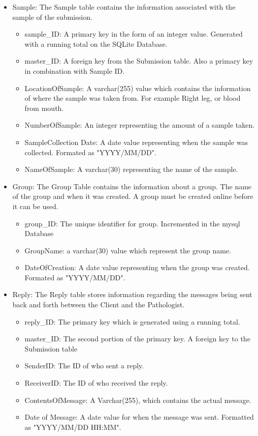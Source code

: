 \documentclass[onecolumn, draftclsnofoot,10pt, compsoc]{IEEEtran}
\begin{document}
\begin{itemize}
\item Sample:\newline
The Sample table contains the information associated with the sample of the submission. 
\begin{itemize}
\item sample\_ID: A primary key in the form of an integer value. Generated with a running total on the SQLite Database.
\item master\_ID: A foreign key from the Submission table. Also a primary key in combination with Sample ID.
\item LocationOfSample: A varchar(255) value which contains the information of where the sample was taken from. For example Right leg, or blood from mouth.
\item NumberOfSample: An integer representing the amount of a sample taken.
\item SampleCollection Date: A date value representing when the sample was collected. Formated as "YYYY/MM/DD".
\item NameOfSample: A varchar(30) representing the name of the sample.
\end{itemize}

\item Group:\newline
The Group Table contains the information about a group. The name of the group and when it was created. A group must be created online before it can be used.
\begin{itemize}
\item group\_ID: The unique identifier for group. Incremented in the mysql Database
\item GroupName: a varchar(30) value which represent the group name. 
\item DateOfCreation: A date value representing when the group was created. Formated as "YYYY/MM/DD".
\end{itemize}

\item Reply:\newline
The Reply table stores information regarding the messages being sent back and forth between the Client and the Pathologist.
\begin{itemize}
\item reply\_ID: The primary key which is generated using a running total.
\item master\_ID: The second portion of the primary key. A foreign key to the Submission table
\item SenderID: The ID of who sent a reply.
\item ReceiverID: The ID of who received the reply.
\item ContentsOfMessage: A Varchar(255), which contains the actual message.
\item Date of Message: A date value for when the message was sent. Formatted as "YYYY/MM/DD HH:MM".
\end{itemize}


\end{itemize}
\end{document}
